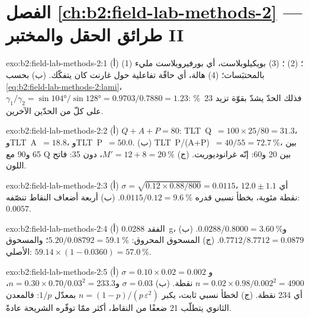 \section*{الفصل \ref{ch:b2:field-lab-methods-2} --- طرائق الحقل والمختبر II}

\begin{solution}{exo:b2:field-lab-methods-2:1}
(أ) (1) ؛ (2) ؛ (3) بويكيلوبلاست، أي بورفيروبلاست مليء
بالمحتبَسات؛ (4) هالة، أي حافّة تفاعلية حول غارنت كان يتفكّك. (ب) بحسب
\eqref{eq:b2:field-lab-methods-2:lami}، $\gamma_1/\gamma_2 = \sin\ang{104}/\sin\ang{128} =
0.9703/0.7880 = 1.23$: فذلك الحدّ يشدّ بقوّة تزيد \qty{23}{\percent} على كلّ من الحدّين الآخرين.
\end{solution}

\begin{solution}{exo:b2:field-lab-methods-2:2}
(أ) $Q + A + P = 80$: \mbox{\textdir TLT Q $= 100 \times 25/80 = 31.3$}، و\mbox{\textdir TLT A $= 18.8$}، و\mbox{\textdir TLT P $= 50.0$}. (ب) \mbox{\textdir TLT P/(A+P) $=
40/55 = \qty{72.7}{\percent}$}، بين 65 و90 مع Q بين 20 و60: إنّه غرانوديوريت.
(ج) $M' = 12 + 8 = \qty{20}{\percent}$، دون 35: فاتح اللون.
\end{solution}

\begin{solution}{exo:b2:field-lab-methods-2:3}
(أ) $\sigma = \sqrt{0.12 \times 0.88/800} = 0.0115$، أي $12.0 \pm 1.1$ نقطة مئوية، بخطأ
نسبي قدره $0.0115/0.12 = \qty{9.6}{\percent}$. (ب) أربعة أضعاف النقاط تنصّفه: $0.0057$.
\end{solution}

\begin{solution}{exo:b2:field-lab-methods-2:4}
(أ) الفقد \qty{0.0288}{g}، و$0.0288/0.8000 = \qty{3.60}{\percent}$.
(ب) $0.7712/8.7712 = 0.0879$.
(ج) المسحوق المحروق: $5.20/0.08792 = \qty{59.1}{\percent}$؛ والمسحوق الأصلي:
$59.14 \times (1 - 0.0360) = \qty{57.0}{\percent}$.
\end{solution}

\begin{solution}{exo:b2:field-lab-methods-2:5}
(أ) $\sigma = 0.10 \times 0.02 = 0.002$ و$n = 0.02 \times 0.98/0.002^2 = 4900$ نقطة.
(ب) $\sigma = 0.03$ و$n = 0.30 \times 0.70/0.03^2 = 233.3$، أي 234 نقطة. (ج) لخطأ نسبي
ثابت، يكبر $n = (1-p)/(p\,\varepsilon^2)$ بمعدّل $1/p$: فالمعدن الثانوي يتطلّب 21 ضعفًا من
النقاط، أكثر ممّا توفّره الشريحة عادةً.
\end{solution}

